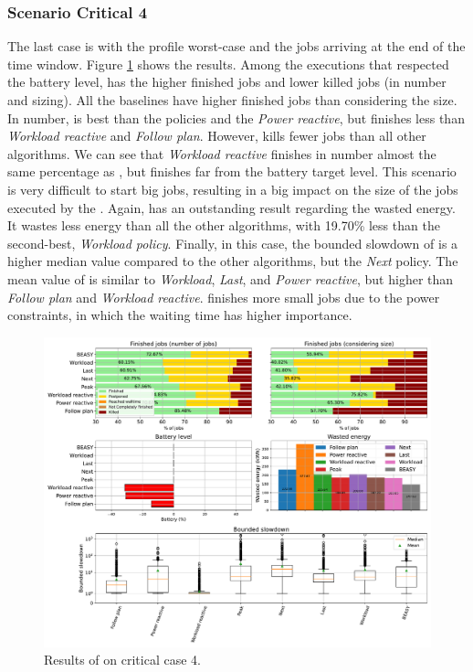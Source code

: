 \clearpage

\subsubsection{Scenario Critical 4}

The last case is with the profile worst-case and the jobs arriving at the end of the time window. Figure \ref{fig:beasy_critical_4} shows the results. Among the executions that respected the battery level, \emph{\systemName} has the higher finished jobs and lower killed jobs (in number and sizing). All the baselines have higher finished jobs than \emph{\systemName} considering the size. In number, \emph{\systemName} is best than the policies and the \emph{Power reactive}, but finishes less than \emph{Workload reactive} and \emph{Follow plan}. However, \emph{\systemName} kills fewer jobs than all other algorithms. We can see that \emph{Workload reactive} finishes in number almost the same percentage as \emph{\systemName}, but finishes far from the battery target level. This scenario is very difficult to start big jobs, resulting in a big impact on the size of the jobs executed by the \emph{\systemName}. Again, \emph{\systemName} has an outstanding result regarding the wasted energy. It wastes less energy than all the other algorithms, with 19.70\% less than the second-best, \emph{Workload policy}. Finally, in this case, the bounded slowdown of \emph{\systemName} is a higher median value compared to the other algorithms, but the \emph{Next} policy. The mean value of \emph{\systemName} is similar to \emph{Workload}, \emph{Last}, and \emph{Power reactive}, but higher than \emph{Follow plan} and \emph{Workload reactive}. \emph{\systemName} finishes more small jobs due to the power constraints, in which the waiting time has higher importance. 

\begin{figure}[!htb]
    \centering
    \includegraphics[scale=0.39]{Images/Heuristic/profile_worst_workload_2_with_noise.pdf}
    \caption{Results of \emph{\systemName} on critical case 4.}
    \label{fig:beasy_critical_4}
\end{figure}

